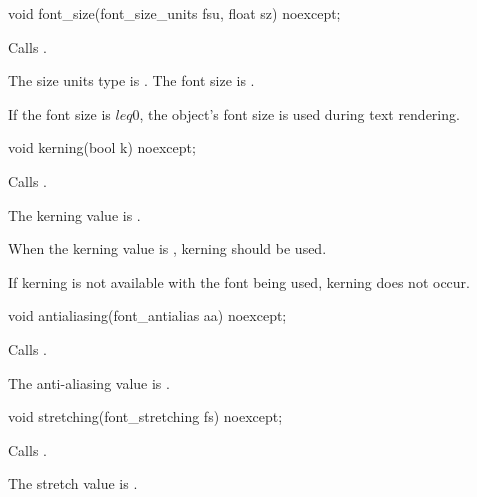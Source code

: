%
\begin{itemdecl}
void font_size(font_size_units fsu, float sz) noexcept;
\end{itemdecl}
\begin{itemdescr}
\pnum
\effects Calls .

\pnum
\remarks The size units type is . The font size is .

\pnum If the font size is $leq 0$, the  object's font size is used during text rendering.
\end{itemdescr}

%
\begin{itemdecl}
void kerning(bool k) noexcept;
\end{itemdecl}
\begin{itemdescr}
\pnum
\effects Calls .

\pnum
\remarks The kerning value is .

\pnum When the kerning value is , kerning should be used.

\pnum
\begin{note}
If kerning is not available with the font being used, kerning does not occur.
\end{note}
\end{itemdescr}

%
\begin{itemdecl}
void antialiasing(font_antialias aa) noexcept;
\end{itemdecl}
\begin{itemdescr}
\pnum
\effects Calls .

\pnum
\remarks The anti-aliasing value is .
\end{itemdescr}

%
\begin{itemdecl}
void stretching(font_stretching fs) noexcept;
\end{itemdecl}
\begin{itemdescr}
\pnum
\effects Calls .

\pnum
\remarks The stretch value is .
\end{itemdescr}

